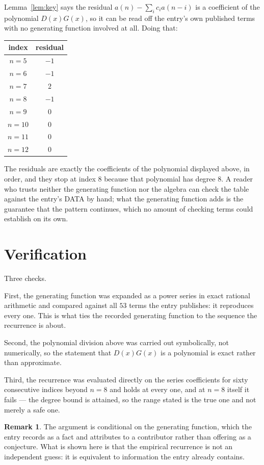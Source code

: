\documentclass[11pt,a4paper]{article}
\theoremstyle{plain}
\theoremstyle{definition}
\newtheorem{remark}[theorem]{Remark}
\begin{document}
Lemma~\ref{lem:key} says the residual $a(n)-\sum_ic_ia(n-i)$ is a coefficient of the
polynomial $D(x)G(x)$, so it can be read off the entry's own published terms with no
generating function involved at all. Doing that:
\begin{center}
\begin{tabular}{cc}
index & residual \\ \hline
$n=5$ & $-1$ \\
$n=6$ & $-1$ \\
$n=7$ & $2$ \\
$n=8$ & $-1$ \\
$n=9$ & $0$ \\
$n=10$ & $0$ \\
$n=11$ & $0$ \\
$n=12$ & $0$
\end{tabular}
\end{center}
The residuals are exactly the coefficients of the polynomial displayed above, in order, and
they stop at index $8$ because that polynomial has degree $8$. A reader who trusts
neither the generating function nor the algebra can check the table against the entry's DATA
by hand; what the generating function adds is the guarantee that the pattern continues, which
no amount of checking terms could establish on its own.

\section{Verification}

Three checks.

First, the generating function was expanded as a power series in exact rational arithmetic and
compared against all $53$ terms the entry publishes: it reproduces every one. This is
what ties the recorded generating function to the sequence the recurrence is about.

Second, the polynomial division above was carried out symbolically, not numerically, so the
statement that $D(x)G(x)$ is a polynomial is exact rather than approximate.

Third, the recurrence was evaluated directly on the series coefficients for sixty consecutive
indices beyond $n=8$ and holds at every one, and at $n=8$ itself it fails --- the
degree bound is attained, so the range stated is the true one and not merely a safe one.

\begin{remark}
The argument is conditional on the generating function, which the entry records as a fact and
attributes to a contributor rather than offering as a conjecture. What is shown here is that
the empirical recurrence is not an independent guess: it is equivalent to information the
entry already contains.
\end{remark}
\end{document}
